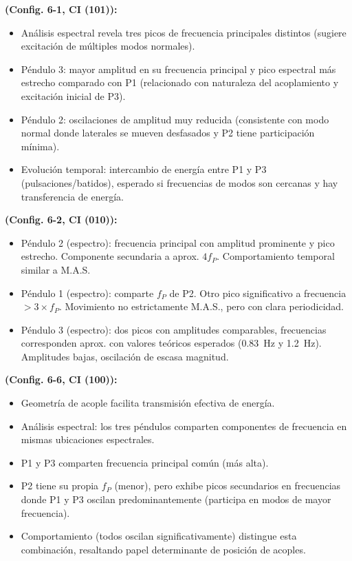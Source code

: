 \textbf{ (Config. 6-1, CI (101)):}
\begin{itemize}
  \item An\'alisis espectral revela tres picos de frecuencia principales
    distintos (sugiere excitaci\'on de m\'ultiples modos normales).
  \item P\'endulo 3: mayor amplitud en su frecuencia principal y pico
    espectral m\'as estrecho comparado con P1 (relacionado con
    naturaleza del acoplamiento y excitaci\'on inicial de P3).
  \item P\'endulo 2: oscilaciones de amplitud muy reducida (consistente con
    modo normal donde laterales se mueven desfasados y P2 tiene
    participaci\'on m\'inima).
  \item Evoluci\'on temporal: intercambio de energ\'ia entre P1 y P3
    (pulsaciones/batidos), esperado si frecuencias de modos son cercanas
    y hay transferencia de energ\'ia.
\end{itemize}

\textbf{ (Config. 6-2, CI (010)):}
\begin{itemize}
  \item P\'endulo 2 (espectro): frecuencia principal con amplitud prominente y
    pico estrecho. Componente secundaria a aprox. $4 f_P$.
    Comportamiento temporal similar a M.A.S.
  \item P\'endulo 1 (espectro): comparte $f_P$ de P2. Otro pico significativo
    a frecuencia $> 3 \times f_P$. Movimiento no estrictamente M.A.S.,
    pero con clara periodicidad.
  \item P\'endulo 3 (espectro): dos picos con amplitudes comparables,
    frecuencias corresponden aprox. con valores te\'oricos esperados
    (\qty{0.83}{\Hz} y \qty{1.2}{\Hz}). Amplitudes bajas, oscilaci\'on
    de escasa magnitud.
\end{itemize}

\textbf{ (Config. 6-6, CI (100)):}
\begin{itemize}
  \item Geometr\'ia de acople facilita transmisi\'on efectiva de energ\'ia.
  \item An\'alisis espectral: los tres p\'endulos comparten componentes de
    frecuencia en mismas ubicaciones espectrales.
  \item P1 y P3 comparten frecuencia principal com\'un (m\'as alta).
  \item P2 tiene su propia $f_P$ (menor), pero exhibe picos secundarios en
    frecuencias donde P1 y P3 oscilan predominantemente (participa en
    modos de mayor frecuencia).
  \item Comportamiento (todos oscilan significativamente) distingue esta
    combinaci\'on, resaltando papel determinante de posici\'on de acoples.
\end{itemize}
